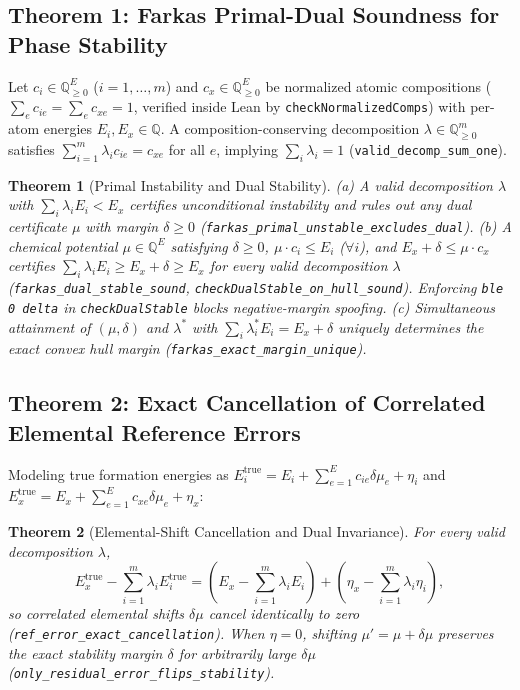 \documentclass[11pt,a4paper]{article}
\newcommand{\br}{\allowbreak{}}
\newtheorem{theorem}{Theorem}
\begin{document}
\subsection{Theorem 1: Farkas Primal-Dual Soundness for Phase Stability}
Let $c_i \in \mathbb{Q}_{\ge 0}^E$ ($i = 1,\dots,m$) and $c_x \in \mathbb{Q}_{\ge 0}^E$ be normalized atomic compositions ($\sum_e c_{ie} = \sum_e c_{xe} = 1$, verified inside Lean by \texttt{checkNormalizedComps}) with per-atom energies $E_i, E_x \in \mathbb{Q}$. A composition-conserving decomposition $\lambda \in \mathbb{Q}_{\ge 0}^m$ satisfies $\sum_{i=1}^m \lambda_i c_{ie} = c_{xe}$ for all $e$, implying $\sum_i \lambda_i = 1$ (\texttt{valid\_\br{}decomp\_\br{}sum\_\br{}one}).

\begin{theorem}[Primal Instability and Dual Stability]
(a) A valid decomposition $\lambda$ with $\sum_i \lambda_i E_i < E_x$ certifies unconditional instability and rules out any dual certificate $\mu$ with margin $\delta \ge 0$ (\texttt{farkas\_\br{}primal\_\br{}unstable\_\br{}excludes\_\br{}dual}).
(b) A chemical potential $\mu \in \mathbb{Q}^E$ satisfying $\delta \ge 0$, $\mu \cdot c_i \le E_i$ ($\forall i$), and $E_x + \delta \le \mu \cdot c_x$ certifies $\sum_i \lambda_i E_i \ge E_x + \delta \ge E_x$ for every valid decomposition $\lambda$ (\texttt{farkas\_\br{}dual\_\br{}stable\_\br{}sound}, \texttt{checkDualStable\_\br{}on\_\br{}hull\_\br{}sound}). Enforcing \texttt{ble 0 delta} in \texttt{checkDualStable} blocks negative-margin spoofing.
(c) Simultaneous attainment of $(\mu,\delta)$ and $\lambda^*$ with $\sum_i \lambda^*_i E_i = E_x + \delta$ uniquely determines the exact convex hull margin (\texttt{farkas\_\br{}exact\_\br{}margin\_\br{}unique}).
\end{theorem}

\subsection{Theorem 2: Exact Cancellation of Correlated Elemental Reference Errors}
Modeling true formation energies as $E_i^{\mathrm{true}} = E_i + \sum_{e=1}^E c_{ie}\delta\mu_e + \eta_i$ and $E_x^{\mathrm{true}} = E_x + \sum_{e=1}^E c_{xe}\delta\mu_e + \eta_x$:

\begin{theorem}[Elemental-Shift Cancellation and Dual Invariance]
For every valid decomposition $\lambda$,
\begin{equation}
  E_x^{\mathrm{true}} - \sum_{i=1}^m \lambda_i E_i^{\mathrm{true}}
  = \left(E_x - \sum_{i=1}^m \lambda_i E_i\right) + \left(\eta_x - \sum_{i=1}^m \lambda_i \eta_i\right),
\end{equation}
so correlated elemental shifts $\delta\mu$ cancel identically to zero (\texttt{ref\_\br{}error\_\br{}exact\_\br{}cancellation}). When $\eta = 0$, shifting $\mu' = \mu + \delta\mu$ preserves the exact stability margin $\delta$ for arbitrarily large $\delta\mu$ (\texttt{only\_\br{}residual\_\br{}error\_\br{}flips\_\br{}stability}).
\end{theorem}
\end{document}
